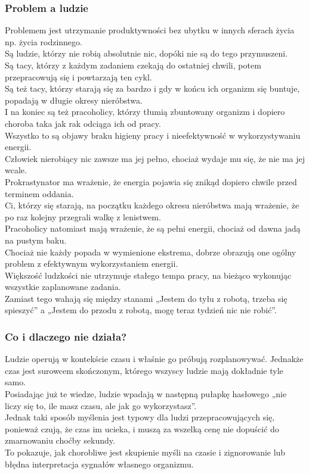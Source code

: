 \documentclass[a4paper,11pt]{report}
\begin{document}
\subsubsection{Problem a ludzie}
Problemem jest utrzymanie produktywności bez ubytku w innych sferach życia np. życia rodzinnego.
\\Są ludzie, którzy nie robią absolutnie nic, dopóki nie są do tego przymuszeni.
\\Są tacy, którzy z każdym zadaniem czekają do ostatniej chwili, potem przepracowują się i powtarzają ten cykl.
\\Są też tacy, którzy starają się za bardzo i gdy w końcu ich organizm się buntuje, popadają w długie okresy nieróbstwa.
\\I na koniec są też pracoholicy, którzy tłumią zbuntowany organizm i dopiero choroba taka jak rak odciąga ich od pracy.
\\Wszystko to są objawy braku higieny pracy i nieefektywność w wykorzystywaniu energii.
\vspace{1cm}
\\Człowiek nierobiący nic zawsze ma jej pełno, chociaż wydaje mu się, że nie ma jej wcale.
\\Prokrastynator ma wrażenie, że energia pojawia się znikąd dopiero chwile przed terminem oddania.
\\Ci, którzy się starają, na początku każdego okresu nieróbstwa mają wrażenie, że po raz kolejny przegrali walkę z lenistwem.
\\Pracoholicy natomiast mają wrażenie, że są pełni energii, chociaż od dawna jadą na pustym baku.
\\Chociaż nie każdy popada w wymienione ekstrema, dobrze obrazują one ogólny problem z efektywnym wykorzystaniem energii.
\vspace{1cm}
\\Większość ludzkości nie utrzymuje stałego tempa pracy, na bieżąco wykonując wszystkie zaplanowane zadania.
\\Zamiast tego wahają się między stanami „Jestem do tyłu z robotą, trzeba się spieszyć” a „Jestem do przodu z robotą, mogę teraz tydzień nic nie robić”.
\subsubsection{Co i dlaczego nie działa?}
Ludzie operują w kontekście czasu i właśnie go próbują rozplanowywać. Jednakże czas jest surowcem skończonym, którego wszyscy ludzie mają dokładnie tyle samo.
\\Posiadając już te wiedze, ludzie wpadają w następną pułapkę hasłowego „nie liczy się to, ile masz czasu, ale jak go wykorzystasz”.
\\Jednak taki sposób myślenia jest typowy dla ludzi przepracowujących się, ponieważ czują, że czas im ucieka, i muszą za wszelką cenę nie dopuścić do zmarnowaniu choćby sekundy.
\\To pokazuje, jak chorobliwe jest skupienie myśli na czasie i zignorowanie lub błędna interpretacja sygnałów własnego organizmu.
\end{document}
